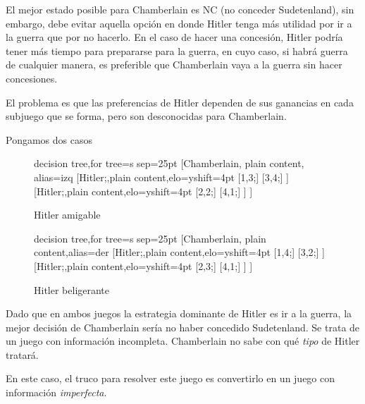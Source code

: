 \documentclass[12pt]{article}
\begin{document}
El mejor estado posible para Chamberlain es NC (no conceder Sudetenland), sin embargo, debe evitar aquella opción en donde Hitler tenga más utilidad por ir a la guerra que por no hacerlo. En el caso de hacer una concesión, Hitler podría tener más tiempo para prepararse para la guerra, en cuyo caso, si habrá guerra de cualquier manera, es preferible que Chamberlain vaya a la guerra sin hacer concesiones.

El problema es que las preferencias de Hitler dependen de sus ganancias en cada subjuego que se forma, pero son desconocidas para Chamberlain.

Pongamos dos casos

\begin{figure}[H]
	\centering
	\begin{minipage}{.5\textwidth}
		\footnotesize{
			\begin{forest} decision tree,for tree={s sep=25pt}
				[Chamberlain, plain content, alias=izq
				[Hitler;,plain content,elo={yshift=4pt}
					[{1,3};]
					[{3,4};]
				]
				[Hitler;,plain content,elo={yshift=4pt}
					[{2,2};]
					[{4,1};]
				]
				]
			\end{forest}}
		\caption{Hitler amigable}
	\end{minipage}%
	\begin{minipage}{.5\textwidth}
		\footnotesize{
			\begin{forest} decision tree,for tree={s sep=25pt}
				[Chamberlain, plain content,alias=der
				[Hitler;,plain content,elo={yshift=4pt}
					[{1,4};]
					[{3,2};]
				]
				[Hitler;,plain content,elo={yshift=4pt}
					[{2,3};]
					[{4,1};]
				]
				]
			\end{forest}}
		\caption{Hitler beligerante}
	\end{minipage}
\end{figure}

Dado que en ambos juegos la estrategia dominante de Hitler es ir a la guerra, la mejor decisión de Chamberlain sería no haber concedido Sudetenland. Se trata de un juego con información incompleta. Chamberlain no sabe con qué \textit{tipo} de Hitler tratará.

En este caso, el truco para resolver este juego es convertirlo en un juego con información \textit{imperfecta}.
\end{document}
